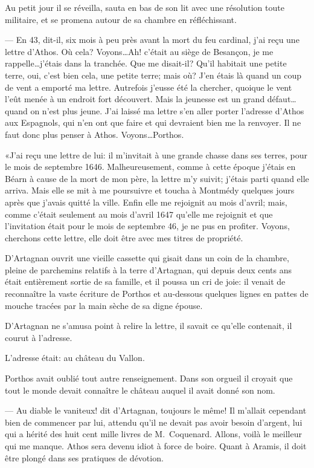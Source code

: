 Au petit jour il se réveilla, sauta en bas de son lit avec une résolution toute militaire, et se promena autour de sa chambre en réfléchissant.

— En 43, dit-il, six mois à peu près avant la mort du feu cardinal, j'ai reçu une lettre d'Athos. Où cela? Voyons\dots Ah! c'était au siège de Besançon, je me rappelle\dots j'étais dans la tranchée. Que me disait-il? Qu'il habitait une petite terre, oui, c'est bien cela, une petite terre; mais où? J'en étais là quand un coup de vent a emporté ma lettre. Autrefois j'eusse été la chercher, quoique le vent l'eût menée à un endroit fort découvert. Mais la jeunesse est un grand défaut\dots quand on n'est plus jeune. J'ai laissé ma lettre s'en aller porter l'adresse d'Athos aux Espagnols, qui n'en ont que faire et qui devraient bien me la renvoyer. Il ne faut donc plus penser à Athos. Voyons\dots Porthos.

«J'ai reçu une lettre de lui: il m'invitait à une grande chasse dans ses terres, pour le mois de septembre 1646. Malheureusement, comme à cette époque j'étais en Béarn à cause de la mort de mon père, la lettre m'y suivit; j'étais parti quand elle arriva. Mais elle se mit à me poursuivre et toucha à Montmédy quelques jours après que j'avais quitté la ville. Enfin elle me rejoignit au mois d'avril; mais, comme c'était seulement au mois d'avril 1647 qu'elle me rejoignit et que l'invitation était pour le mois de septembre 46, je ne pus en profiter. Voyons, cherchons cette lettre, elle doit être avec mes titres de propriété.

D'Artagnan ouvrit une vieille cassette qui gisait dans un coin de la chambre, pleine de parchemins relatifs à la terre d'Artagnan, qui depuis deux cents ans était entièrement sortie de sa famille, et il poussa un cri de joie: il venait de reconnaître la vaste écriture de Porthos et au-dessous quelques lignes en pattes de mouche tracées par la main sèche de sa digne épouse.

D'Artagnan ne s'amusa point à relire la lettre, il savait ce qu'elle contenait, il courut à l'adresse.

L'adresse était: au château du Vallon.

Porthos avait oublié tout autre renseignement. Dans son orgueil il croyait que tout le monde devait connaître le château auquel il avait donné son nom.

— Au diable le vaniteux! dit d'Artagnan, toujours le même! Il m'allait cependant bien de commencer par lui, attendu qu'il ne devait pas avoir besoin d'argent, lui qui a hérité des huit cent mille livres de M.~Coquenard. Allons, voilà le meilleur qui me manque. Athos sera devenu idiot à force de boire. Quant à Aramis, il doit être plongé dans ses pratiques de dévotion.

